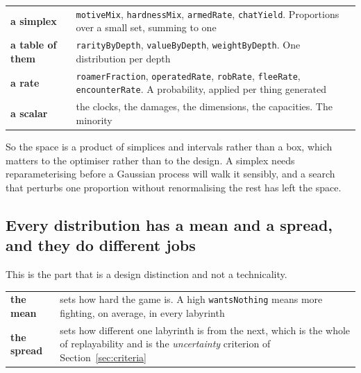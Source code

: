 \documentclass[11pt,a4paper]{article}
\begin{document}
\begin{center}
\begin{tabular}{@{}l@{\hspace{4mm}}>{\raggedright\arraybackslash}p{}@{}}
\toprule
\textbf{a simplex} & \texttt{motiveMix}, \texttt{hardnessMix}, \texttt{armedRate},
\texttt{chatYield}. Proportions over a small set, summing to one \\[1mm]
\textbf{a table of them} & \texttt{rarityByDepth}, \texttt{valueByDepth}, \texttt{weightByDepth}.
One distribution per depth \\[1mm]
\textbf{a rate}    & \texttt{roamerFraction}, \texttt{operatedRate}, \texttt{robRate},
\texttt{fleeRate}, \texttt{encounterRate}. A probability, applied per thing generated \\[1mm]
\textbf{a scalar}  & the clocks, the damages, the dimensions, the capacities. The minority \\
\bottomrule
\end{tabular}
\end{center}

So the space is a product of simplices and intervals rather than a box, which matters to the
optimiser rather than to the design. A simplex needs reparameterising before a Gaussian process
will walk it sensibly, and a search that perturbs one proportion without renormalising the rest has
left the space.

\subsection{Every distribution has a mean and a spread, and they do different jobs}

This is the part that is a design distinction and not a technicality.

\begin{center}
\begin{tabular}{@{}l@{\hspace{5mm}}>{\raggedright\arraybackslash}p{}@{}}
\toprule
\textbf{the mean}   & sets how hard the game is. A high \texttt{wantsNothing} means more fighting,
on average, in every labyrinth \\[1mm]
\textbf{the spread} & sets how different one labyrinth is from the next, which is the whole of
replayability and is the \emph{uncertainty} criterion of Section~\ref{sec:criteria} \\
\bottomrule
\end{tabular}
\end{center}
\end{document}
